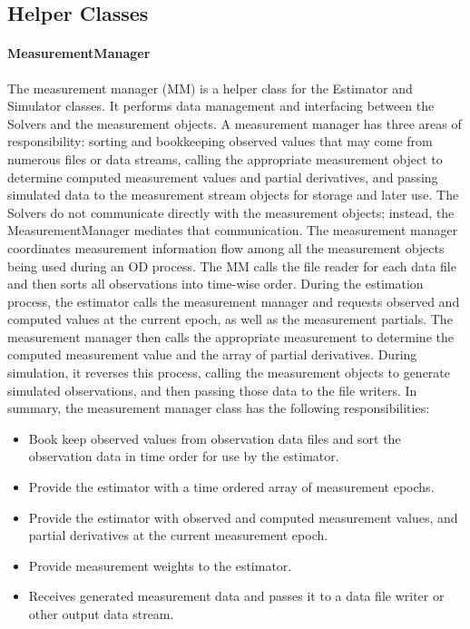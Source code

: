 \subsection{Helper Classes}

\paragraph{MeasurementManager} The measurement manager (MM) is a helper class for the Estimator
and Simulator classes.  It performs data management and interfacing between the Solvers and the
measurement
objects.  A measurement manager has three areas of responsibility: sorting and bookkeeping observed
values that may come from numerous files or data streams, calling the appropriate measurement
object to determine computed measurement values and partial derivatives, and passing simulated data
to the measurement stream objects for storage and later use.  The Solvers do not
communicate directly with the measurement objects; instead, the MeasurementManager mediates that
communication.  The measurement manager coordinates measurement information flow among all the
measurement objects being used during an OD process.  The MM calls the file reader for each data
file and then sorts all observations into time-wise
order.  During the estimation process, the estimator calls the measurement manager and requests
observed and computed values at the current epoch, as well as the measurement partials.   The
measurement manager then calls the appropriate measurement to determine the computed
measurement value and the array of partial derivatives.  During simulation, it reverses this
process, calling the measurement objects to generate simulated observations, and then passing those
data to the file writers.  In summary, the measurement manager class
has the following responsibilities:
\begin{itemize}
\item Book keep observed values from observation data files and sort the observation data in time
order for use by the estimator.
\item Provide the estimator with a time ordered array of measurement epochs.
\item Provide the estimator with observed and computed measurement values, and partial derivatives
at the current measurement epoch.
\item Provide measurement weights to the estimator.
\item Receives generated measurement data and passes it to a data file writer or other output data
stream.
\end{itemize}

